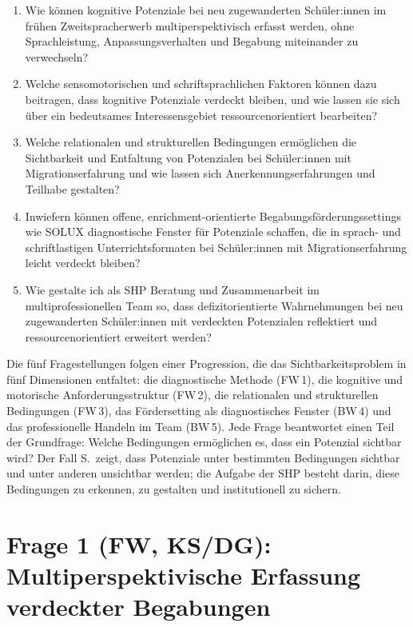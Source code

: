 \documentclass[ngerman, a4paper]{article}
\begin{document}
\begin{enumerate}
  \item[\textbf{FW\,1 (KS/DG)}] Wie können kognitive Potenziale bei neu
    zugewanderten Schüler:innen im frühen Zweitspracherwerb
    multiperspektivisch erfasst werden, ohne Sprachleistung,
    Anpassungsverhalten und Begabung miteinander zu verwechseln?
  \item[\textbf{FW\,2 (MW/KS)}] Welche sensomotorischen und schriftsprachlichen
    Faktoren können dazu beitragen, dass kognitive Potenziale verdeckt bleiben,
    und wie lassen sie sich über ein bedeutsames Interessensgebiet
    ressourcenorientiert bearbeiten?
  \item[\textbf{FW\,3 (PB)}] Welche relationalen und strukturellen Bedingungen
    ermöglichen die Sichtbarkeit und Entfaltung von Potenzialen bei
    Schüler:innen mit Migrationserfahrung und wie lassen sich
    Anerkennungserfahrungen und Teilhabe gestalten?
  \item[\textbf{BW\,4 (DG/PV)}] Inwiefern können offene, enrichment-orientierte
    Begabungsförderungssettings wie SOLUX diagnostische Fenster für
    Potenziale schaffen, die in sprach- und schriftlastigen
    Unterrichtsformaten bei Schüler:innen mit Migrationserfahrung
    leicht verdeckt bleiben?
  \item[\textbf{BW\,5 (ZB/PV)}] Wie gestalte ich als SHP Beratung und
    Zusammenarbeit im multiprofessionellen Team so, dass defizitorientierte
    Wahrnehmungen bei neu zugewanderten Schüler:innen mit verdeckten Potenzialen
    reflektiert und ressourcenorientiert erweitert werden?
\end{enumerate}

Die fünf Fragestellungen folgen einer Progression, die das Sichtbarkeitsproblem
in fünf Dimensionen entfaltet: die diagnostische Methode (FW\,1), die
kognitive und motorische Anforderungsstruktur (FW\,2), die relationalen und
strukturellen Bedingungen (FW\,3), das Fördersetting als diagnostisches
Fenster (BW\,4) und das professionelle Handeln im Team (BW\,5). Jede Frage
beantwortet einen Teil der Grundfrage: Welche Bedingungen ermöglichen es, dass
ein Potenzial sichtbar wird? Der Fall S.\ zeigt, dass Potenziale unter
bestimmten Bedingungen sichtbar und unter anderen unsichtbar werden; die
Aufgabe der SHP besteht darin, diese Bedingungen zu erkennen, zu gestalten
und institutionell zu sichern.

\newpage
 
\section{Frage 1 (FW, KS/DG): Multiperspektivische Erfassung verdeckter Begabungen}
\label{sec:frage1}
 
\end{document}
